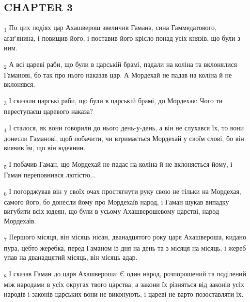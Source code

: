 \subsection{CHAPTER 3}
\begin{tcolorbox}
\textsubscript{1} По цих подіях цар Ахашверош звеличив Гамана, сина Гаммедатового, аґаґ'янина, і повищив його, і поставив його крісло понад усіх князів, що були з ним.
\end{tcolorbox}
\begin{tcolorbox}
\textsubscript{2} А всі цареві раби, що були в царській брамі, падали на коліна та вклонялися Гаманові, бо так про нього наказав цар. А Мордехай не падав на коліна й не вклонявся.
\end{tcolorbox}
\begin{tcolorbox}
\textsubscript{3} І сказали царські раби, що були в царській брамі, до Мордехая: Чого ти переступаєш царевого наказа?
\end{tcolorbox}
\begin{tcolorbox}
\textsubscript{4} І сталося, як вони говорили до нього день-у-день, а він не слухався їх, то вони донесли Гаманові, щоб побачити, чи втримається Мордехай у своїм слові, бо він виявив їм, що він юдеянин.
\end{tcolorbox}
\begin{tcolorbox}
\textsubscript{5} І побачив Гаман, що Мордехай не падає на коліна й не вклоняється йому, і Гаман переповнився лютістю...
\end{tcolorbox}
\begin{tcolorbox}
\textsubscript{6} І погорджував він у своїх очах простягнути руку свою не тільки на Мордехая, самого його, бо донесли йому про Мордехаїв народ, і Гаман шукав випадку вигубити всіх юдеян, що були в усьому Ахашверошевому царстві, народ Мордехаїв.
\end{tcolorbox}
\begin{tcolorbox}
\textsubscript{7} Першого місяця, він місяць нісан, дванадцятого року царя Ахашвероша, кидано пура, цебто жеребка, перед Гаманом із дня на день та з місяця на місяць, і жереб упав на дванадцятий місяць, він місяць адар.
\end{tcolorbox}
\begin{tcolorbox}
\textsubscript{8} І сказав Гаман до царя Ахашвероша: Є один народ, розпорошений та поділений між народами в усіх округах твого царства, а закони їх різняться від законів усіх народів і законів царських вони не виконують, і цареві не варто позоставляти їх.
\end{tcolorbox}

